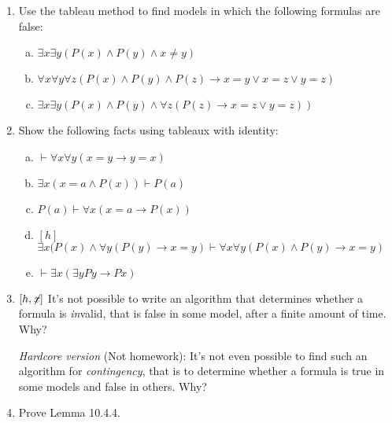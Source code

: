 \begin{enumerate}[\thesection.1]
			\item Use the tableau method to find models in which the following formulas are false:
			
			\begin{enumerate}[(a)]
			
				\item $\exists x\exists y(P(x)\land P(y)\land x\neq y)$
				
				\item $\forall x\forall y\forall z(P(x)\land P(y)\land P(z)\to x=y\lor x=z\lor y=z)$
				
				\item $\exists x\exists y(P(x)\land P(y)\land \forall z(P(z)\to x=z\lor y=z))$
			
			\end{enumerate}

			\item Show the following facts using tableaux with identity:
			
			\begin{enumerate}[(a)]
						
				\item $\vdash \forall x\forall y(x=y\to y=x)$
						
				\item $\exists x(x=a\land P(x))\vdash P(a)$
				
				\item $P(a)\vdash \forall x(x=a\to P(x))$

				\item $[h]$ $\exists x(P(x)\land \forall y(P(y)\to x=y)\vdash \forall x\forall y(P(x)\land P(y)\to x=y)$
				
				\item $\vdash \exists x(\exists yPy\to Px)$
							
			\end{enumerate}
			
			\item $[h, \not\hspace{-.5ex}x]$ It's not possible to write an algorithm that determines whether a formula is \emph{in}valid, that is false in some model, after a finite amount of time. Why? 
			
			\emph{Hardcore version} (Not homework): It's not even possible to find such an algorithm for \emph{contingency}, that is to determine whether a formula is true in some models and false in others. Why?
			
			\item Prove Lemma 10.4.4.
	
	\end{enumerate}


